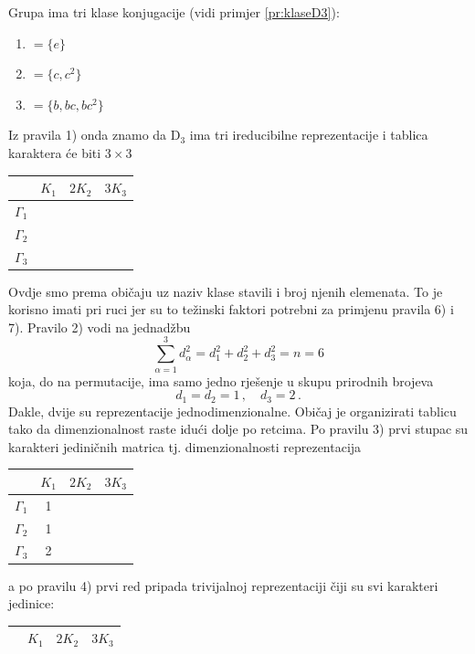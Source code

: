 \begin{primjer}
    \label{pr:karakteriD3}
Grupa ima tri klase konjugacije (vidi primjer \ref{pr:klaseD3}):

\begin{center}
\begin{enumerate}[label=$K_{\mathrm{\arabic{enumi}}}$]
 \item $ = \{e\}$
 \item $ = \{c, c^2\}$
 \item $ =  \{ b, bc, bc^2 \}$
\end{enumerate}
\end{center}

Iz pravila 1) onda znamo da D$_{3}$ ima tri ireducibilne reprezentacije
i tablica karaktera će biti $3 \times 3$
\begin{center}
\begin{tabular}{c|ccc}
  & $K_1$ & $2 K_2$  & $ 3 K_3$ \\ \hline
$\Gamma_1$ &   &  &   \\
$\Gamma_2$ &   &  &   \\
 $\Gamma_3$  &   &  &  
\end{tabular}
\end{center}
Ovdje smo prema običaju uz naziv klase stavili i broj njenih elemenata. To je
korisno imati pri ruci jer su to težinski faktori potrebni za primjenu
pravila 6) i 7).
Pravilo 2) vodi na jednadžbu
 $$\sum_{\alpha=1}^{3} d_{\alpha}^2 = d_{1}^2 + d_{2}^2
   + d_{3}^2 = n = 6 $$
koja, do na permutacije, ima samo jedno rješenje u skupu prirodnih brojeva
 $$ d_1 = d_2 = 1\,,\quad d_3=2 \,. $$
Dakle, dvije su reprezentacije jednodimenzionalne. Običaj je organizirati
tablicu tako da dimenzionalnost raste idući dolje po retcima.
Po pravilu 3) prvi stupac su karakteri jediničnih matrica tj. dimenzionalnosti
reprezentacija
\begin{center}
\begin{tabular}{c|ccc}
  & $K_1$ & $2 K_2$  & $ 3 K_3$ \\ \hline
$\Gamma_1$ & 1 &  &   \\
$\Gamma_2$ & 1 &  &   \\
 $\Gamma_3$  & 2 &  &  
\end{tabular}
\end{center}
a po pravilu 4) prvi red pripada trivijalnoj reprezentaciji čiji su svi karakteri
jedinice:
\begin{center}
\begin{tabular}{c|ccc}
  & $K_1$ & $2 K_2$  & $ 3 K_3$ \\ \hline

\end{tabular}
\end{center}
\end{primjer}
